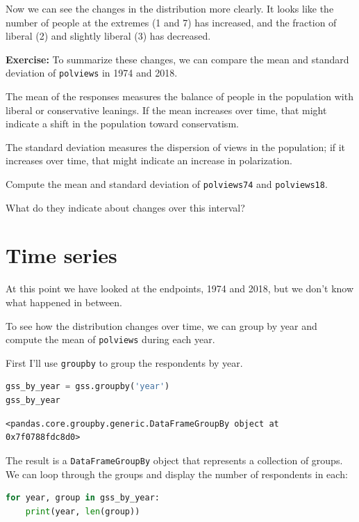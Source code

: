 Now we can see the changes in the distribution more clearly. It looks
like the number of people at the extremes (1 and 7) has increased, and
the fraction of liberal (2) and slightly liberal (3) has decreased.

\textbf{Exercise:} To summarize these changes, we can compare the mean
and standard deviation of \passthrough{\lstinline!polviews!} in 1974 and
2018.

The mean of the responses measures the balance of people in the
population with liberal or conservative leanings. If the mean increases
over time, that might indicate a shift in the population toward
conservatism.

The standard deviation measures the dispersion of views in the
population; if it increases over time, that might indicate an increase
in polarization.

Compute the mean and standard deviation of
\passthrough{\lstinline!polviews74!} and
\passthrough{\lstinline!polviews18!}.

What do they indicate about changes over this interval?

\hypertarget{time-series}{%
\section{Time series}\label{time-series}}

At this point we have looked at the endpoints, 1974 and 2018, but we
don't know what happened in between.

To see how the distribution changes over time, we can group by year and
compute the mean of \passthrough{\lstinline!polviews!} during each year.

First I'll use \passthrough{\lstinline!groupby!} to group the
respondents by year.

\begin{lstlisting}[language=Python,style=source]
gss_by_year = gss.groupby('year')
gss_by_year
\end{lstlisting}

\begin{lstlisting}[style=output]
<pandas.core.groupby.generic.DataFrameGroupBy object at 0x7f0788fdc8d0>
\end{lstlisting}

The result is a \passthrough{\lstinline!DataFrameGroupBy!} object that
represents a collection of groups. We can loop through the groups and
display the number of respondents in each:

\begin{lstlisting}[language=Python,style=source]
for year, group in gss_by_year:
    print(year, len(group))
\end{lstlisting}

